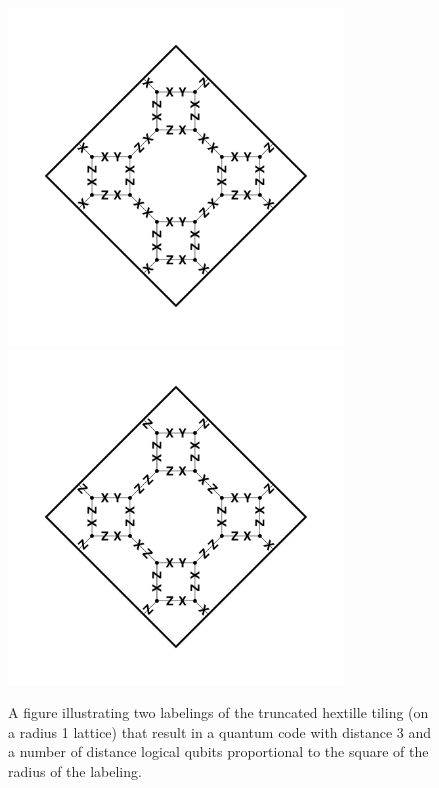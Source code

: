 \documentclass[12pt]{amsbook}
\theoremstyle{plain}
\theoremstyle{definition}
\theoremstyle{remark}
\begin{document}
\begin{figure}
\includegraphics[width=3.5in]{images/truncated-quadrille-code-3-labeling-1} %
\includegraphics[width=3.5in]{images/truncated-quadrille-code-3-labeling-2} %
\caption{
\label{figure:truncated-hextille-code-3-labelings}
A figure illustrating two labelings of the truncated hextille tiling (on a radius 1 lattice) that result in a quantum code with distance 3 and a number of distance logical qubits proportional to the square of the radius of the labeling.
}
\end{figure}
\end{document}
